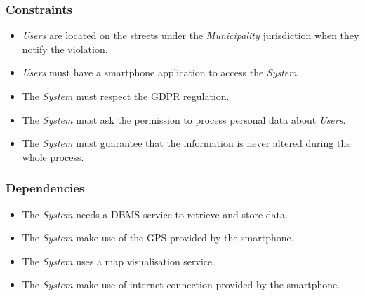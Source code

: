 \documentclass {article}
\begin{document}
		\subsubsection{Constraints}
		\begin{itemize}
		\item {\it Users} are located on the streets under the {\it Municipality} jurisdiction when they notify the violation.
		\item {\it Users} must have a smartphone application to access the {\it System}.
		\item The {\it System} must respect the GDPR regulation.
		\item The {\it System} must ask the permission to process personal data about {\it Users}.
		\item The {\it System} must guarantee that the information is never altered during the whole process. 
		\end{itemize}
		\subsubsection{Dependencies}
		\begin{itemize}
		\item The {\it System} needs a DBMS service to retrieve and store data.
		\item The {\it System} make use of the GPS provided by the smartphone.
		\item The {\it System} uses a map visualisation service.
		\item The {\it System} make use of internet connection provided by the smartphone.
		\end{itemize}
		
\end{document}
